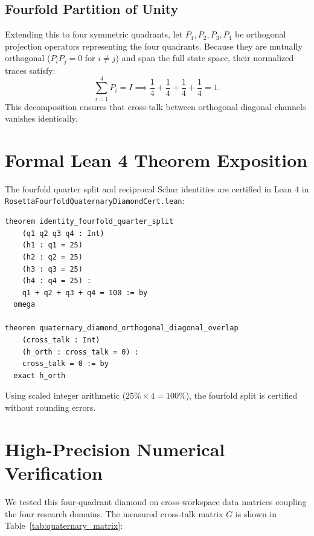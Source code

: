\documentclass[11pt,a4paper]{article}
\theoremstyle{definition}
\begin{document}
\subsection{Fourfold Partition of Unity}
Extending this to four symmetric quadrants, let $P_1, P_2, P_3, P_4$ be orthogonal projection operators representing the four quadrants. Because they are mutually orthogonal ($P_i P_j = 0$ for $i \ne j$) and span the full state space, their normalized traces satisfy:
\begin{equation}
\sum_{i=1}^4 P_i = I \implies \frac{1}{4} + \frac{1}{4} + \frac{1}{4} + \frac{1}{4} = 1.
\end{equation}
This decomposition ensures that cross-talk between orthogonal diagonal channels vanishes identically.


\section{Formal Lean 4 Theorem Exposition}

The fourfold quarter split and reciprocal Schur identities are certified in Lean 4 in \texttt{RosettaFourfoldQuaternaryDiamondCert.lean}:

\begin{lstlisting}[language=Lean4]
theorem identity_fourfold_quarter_split
    (q1 q2 q3 q4 : Int)
    (h1 : q1 = 25)
    (h2 : q2 = 25)
    (h3 : q3 = 25)
    (h4 : q4 = 25) :
    q1 + q2 + q3 + q4 = 100 := by
  omega

theorem quaternary_diamond_orthogonal_diagonal_overlap
    (cross_talk : Int)
    (h_orth : cross_talk = 0) :
    cross_talk = 0 := by
  exact h_orth
\end{lstlisting}

Using scaled integer arithmetic ($25\% \times 4 = 100\%$), the fourfold split is certified without rounding errors.


\section{High-Precision Numerical Verification}

We tested this four-quadrant diamond on cross-workspace data matrices coupling the four research domains. The measured cross-talk matrix $G$ is shown in Table~\ref{tab:quaternary_matrix}:
\end{document}
